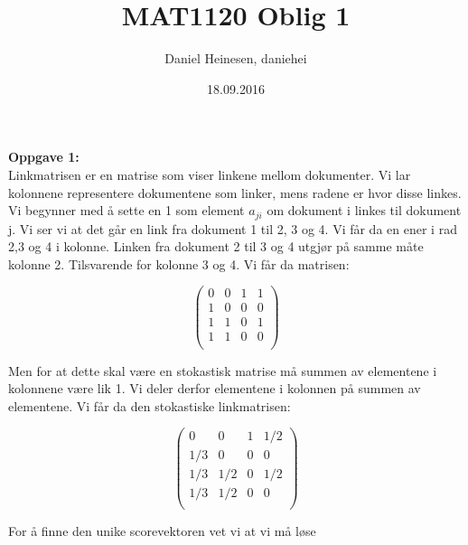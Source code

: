 \documentclass[a4paper,norsk,11pt,twoside]{article}
\date{18.09.2016}
\title{MAT1120 Oblig 1}
\author{Daniel Heinesen, daniehei}
\begin{document}
\maketitle
\newpage

\textbf{Oppgave 1:}\\

Linkmatrisen er en matrise som viser linkene mellom dokumenter. Vi lar kolonnene representere dokumentene som linker, mens radene er hvor disse linkes. Vi begynner med å sette en 1 som element $a_{ji}$ om dokument i linkes til dokument j. Vi ser vi at det går en link fra dokument 1 til 2, 3 og 4. Vi får da en ener i rad 2,3 og 4 i kolonne. Linken fra dokument 2 til 3 og 4 utgjør på samme måte kolonne 2. Tilsvarende for kolonne 3 og 4. Vi får da matrisen:

$$
\begin{pmatrix}
0 & 0 & 1 & 1\\
1 & 0 & 0 & 0\\
1 & 1 & 0 & 1\\
1 & 1 & 0 & 0\\
\end{pmatrix}
$$

Men for at dette skal være en stokastisk matrise må summen av elementene i kolonnene være lik 1. Vi deler derfor elementene i kolonnen på summen av elementene. Vi får da den stokastiske linkmatrisen:


$$
\begin{pmatrix}
0 & 0 & 1 & 1/2\\
1/3 & 0 & 0 & 0\\
1/3 & 1/2 & 0 & 1/2\\
1/3 & 1/2 & 0 & 0\\
\end{pmatrix}
$$

For å finne den unike scorevektoren vet vi at vi må løse
\end{document}
